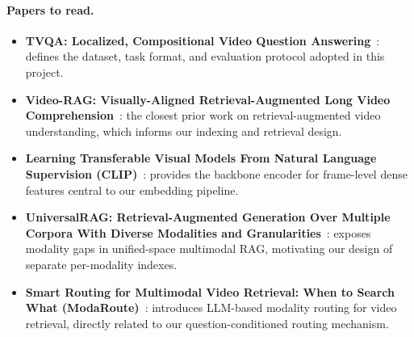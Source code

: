 \documentclass{article}
\begin{document}
\paragraph{Papers to read.}
\begin{itemize}
  \item \textbf{TVQA: Localized, Compositional Video Question Answering}~\cite{lei2018tvqa}: defines the dataset, task format, and evaluation protocol adopted in this project.
  \item \textbf{Video-RAG: Visually-Aligned Retrieval-Augmented Long Video Comprehension}~\cite{luo2024videorag}: the closest prior work on retrieval-augmented video understanding, which informs our indexing and retrieval design.
  \item \textbf{Learning Transferable Visual Models From Natural Language Supervision (CLIP)}~\cite{radford2021clip}: provides the backbone encoder for frame-level dense features central to our embedding pipeline.
  \item \textbf{UniversalRAG: Retrieval-Augmented Generation Over Multiple Corpora With Diverse Modalities and Granularities}~\cite{yeo2025universalrag}: exposes modality gaps in unified-space multimodal RAG, motivating our design of separate per-modality indexes.
  \item \textbf{Smart Routing for Multimodal Video Retrieval: When to Search What (ModaRoute)}~\cite{delarosa2025modaroute}: introduces LLM-based modality routing for video retrieval, directly related to our question-conditioned routing mechanism.
\end{itemize}
\end{document}
